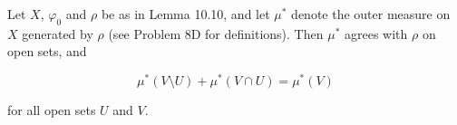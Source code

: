 Let $X$, $\varphi_0$ and $\rho$ be as in Lemma 10.10, and let $\mu^*$ denote the outer measure on $X$ generated by $\rho$ (see Problem 8D for definitions). Then $\mu^*$ agrees with $\rho$ on open sets, and

$$\mu^*(V \setminus U) + \mu^*(V \cap U) = \mu^*(V)$$

for all open sets $U$ and $V.$

